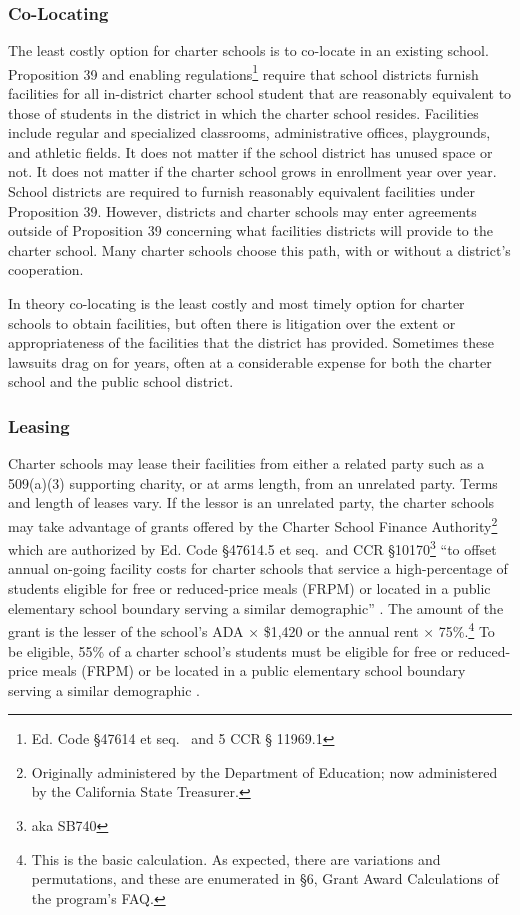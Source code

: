 \subsubsection{Co-Locating}\label{sec:co-locating}\indent%

The least costly option for charter schools is to co-locate in an existing school. Proposition 39 and enabling regulations\footnote{Ed. Code §47614 et seq.  and 5 CCR § 11969.1} require that school districts furnish facilities for all in-district charter school student that are reasonably equivalent to those of students in the district in which the charter school resides. Facilities include regular and specialized classrooms, administrative offices, playgrounds, and athletic fields. It does not matter if the school district has unused space or not. It does not matter if the charter school grows in enrollment year over year. School districts are required to furnish reasonably equivalent facilities under Proposition 39. However, districts and charter schools may enter agreements outside of Proposition 39 concerning what facilities districts will provide to the charter school. Many charter schools choose this path, with or without a district's cooperation.

In theory co-locating is the least costly and most timely option for charter schools to obtain facilities, but often there is litigation over the extent or appropriateness of the facilities that the district has provided. Sometimes these lawsuits drag on for years, often at a considerable expense for both the charter school and the public school district.

\subsubsection{Leasing}\label{sec:leasing}\indent%

Charter schools may lease their facilities from either a related party such as a 509(a)(3) supporting charity, or at arms length, from an unrelated party. Terms and length of leases vary. If the lessor is an unrelated party, the charter schools may take advantage of grants offered by the Charter School Finance Authority\footnote{Originally administered by the Department of Education; now administered by the California State Treasurer.} which are authorized by Ed. Code §47614.5 et seq. and CCR §10170\footnote{aka SB740} ``to offset annual on-going facility costs for charter schools that service a high-percentage of students eligible for free or reduced-price meals (FRPM) or located in a public elementary school boundary serving a similar demographic'' \parencite{CATreasurer2023}. The amount of the grant is the lesser of the school's ADA × \$1,420 or the annual rent × 75\%.\footnote{This is the basic calculation. As expected, there are variations and permutations, and these are enumerated in §6, Grant Award Calculations of the program's FAQ\@.} To be eligible, 55\% of a charter school's students must be eligible for free or reduced-price meals (FRPM) or be located in a public elementary school boundary serving a similar demographic \parencite[§1]{CATreasurer2023}.

